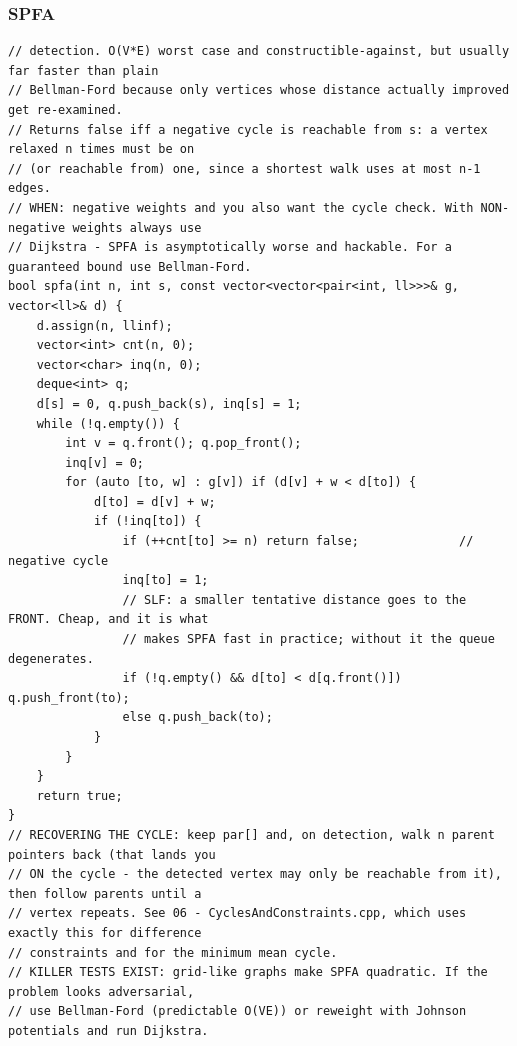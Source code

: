 \documentclass[9pt,a4paper,twocolumn]{extarticle}
\begin{document}
\subsubsection{SPFA}
\nopagebreak
\begin{lstlisting}
// detection. O(V*E) worst case and constructible-against, but usually far faster than plain
// Bellman-Ford because only vertices whose distance actually improved get re-examined.
// Returns false iff a negative cycle is reachable from s: a vertex relaxed n times must be on
// (or reachable from) one, since a shortest walk uses at most n-1 edges.
// WHEN: negative weights and you also want the cycle check. With NON-negative weights always use
// Dijkstra - SPFA is asymptotically worse and hackable. For a guaranteed bound use Bellman-Ford.
bool spfa(int n, int s, const vector<vector<pair<int, ll>>>& g, vector<ll>& d) {
    d.assign(n, llinf);
    vector<int> cnt(n, 0);
    vector<char> inq(n, 0);
    deque<int> q;
    d[s] = 0, q.push_back(s), inq[s] = 1;
    while (!q.empty()) {
        int v = q.front(); q.pop_front();
        inq[v] = 0;
        for (auto [to, w] : g[v]) if (d[v] + w < d[to]) {
            d[to] = d[v] + w;
            if (!inq[to]) {
                if (++cnt[to] >= n) return false;              // negative cycle
                inq[to] = 1;
                // SLF: a smaller tentative distance goes to the FRONT. Cheap, and it is what
                // makes SPFA fast in practice; without it the queue degenerates.
                if (!q.empty() && d[to] < d[q.front()]) q.push_front(to);
                else q.push_back(to);
            }
        }
    }
    return true;
}
// RECOVERING THE CYCLE: keep par[] and, on detection, walk n parent pointers back (that lands you
// ON the cycle - the detected vertex may only be reachable from it), then follow parents until a
// vertex repeats. See 06 - CyclesAndConstraints.cpp, which uses exactly this for difference
// constraints and for the minimum mean cycle.
// KILLER TESTS EXIST: grid-like graphs make SPFA quadratic. If the problem looks adversarial,
// use Bellman-Ford (predictable O(VE)) or reweight with Johnson potentials and run Dijkstra.
\end{lstlisting}

\filbreak
\end{document}
